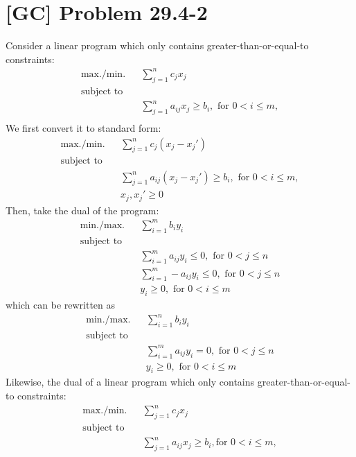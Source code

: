 \documentclass[a4paper,11pt,twocolumn]{article}
\begin{document}
  \section{[GC] Problem 29.4-2}
  Consider a linear program which only contains greater-than-or-equal-to constraints:
  \begin{align*}
    \text{max./min.} && \sum_{j = 1}^{n} c_j x_j \\
    \text{subject to} \\
    && \sum_{j = 1}^{n} a_{ij} x_j \geq b_i, \text{ for } 0 < i \leq m, \\
  \end{align*}
  We first convert it to standard form:
  \begin{align*}
    \text{max./min.} && \sum_{j = 1}^{n} c_j (x_j - x_j') \\
    \text{subject to} \\
    && \sum_{j = 1}^{n} a_{ij} (x_j - x_j') \geq b_i, \text{ for } 0 < i \leq m, \\
    && x_j, x_j' \geq 0
  \end{align*}
  Then, take the dual of the program:
  \begin{align*}
    \text{min./max.} && \sum_{i = 1}^{m} b_iy_i \\
    \text{subject to} \\
    && \sum_{i = 1}^{m} a_{ij} y_i \leq 0, \text{ for } 0 < j \leq n \\
    && \sum_{i = 1}^{m} -a_{ij} y_i \leq 0, \text{ for } 0 < j \leq n \\
    && y_i \geq 0, \text{ for } 0 < i \leq m
  \end{align*}
  which can be rewritten as
  \begin{align*}
    \text{min./max.} && \sum_{i = 1}^{n} b_iy_i \\
    \text{subject to} \\
    && \sum_{i = 1}^{m} a_{ij} y_i = 0, \text{ for } 0 < j \leq n \\
    && y_i \geq 0, \text{ for } 0 < i \leq m
  \end{align*}
  Likewise, the dual of a linear program which only contains greater-than-or-equal-to constraints:
  \begin{align*}
    \text{max./min.} && \sum_{j = 1}^{n} c_j x_j \\
    \text{subject to} \\
    && \sum_{j = 1}^{n} a_{ij} x_j \geq b_i, \text{for } 0 < i \leq m, \\
  \end{align*}
\end{document}
